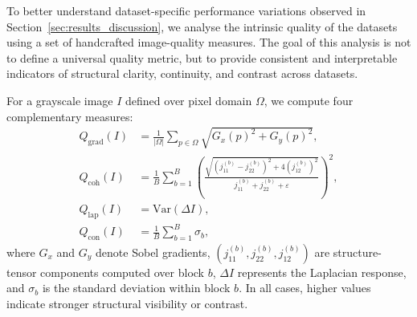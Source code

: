 \documentclass[10pt,journal,compsoc]{IEEEtran}
\begin{document}
To better understand dataset-specific performance variations observed in Section~\ref{sec:results_discussion}, we analyse the intrinsic quality of the datasets using a set of handcrafted image-quality measures. The goal of this analysis is not to define a universal quality metric, but to provide consistent and interpretable indicators of structural clarity, continuity, and contrast across datasets.

For a grayscale image $I$ defined over pixel domain $\Omega$, we compute four complementary measures:
\begin{align}
Q_{\text{grad}}(I) &= \frac{1}{|\Omega|}\sum_{p \in \Omega} \sqrt{G_x(p)^2 + G_y(p)^2}, \\
Q_{\text{coh}}(I) &= \frac{1}{B}\sum_{b=1}^{B}
\left(
\frac{\sqrt{(j_{11}^{(b)}-j_{22}^{(b)})^2 + 4(j_{12}^{(b)})^2}}
{j_{11}^{(b)} + j_{22}^{(b)} + \varepsilon}
\right)^2, \\
Q_{\text{lap}}(I) &= \mathrm{Var}(\Delta I), \\
Q_{\text{con}}(I) &= \frac{1}{B}\sum_{b=1}^{B} \sigma_b,
\end{align}
where $G_x$ and $G_y$ denote Sobel gradients, $(j_{11}^{(b)}, j_{22}^{(b)}, j_{12}^{(b)})$ are structure-tensor components computed over block $b$, $\Delta I$ represents the Laplacian response, and $\sigma_b$ is the standard deviation within block $b$. In all cases, higher values indicate stronger structural visibility or contrast.

\begin{table}[ht!]
    \centering
 \caption{Mean fingervein  image-quality indicators computed across datasets. The metrics quantify gradient strength, structural coherence, edge sharpness (Laplacian variance), and local contrast. Higher values indicate better visibility and continuity of vein structures. The number of images per subject is also reported to highlight dataset density, which impacts verification reliability.}
    \label{tab:rebuttal_quality}
\end{table}
\end{document}
